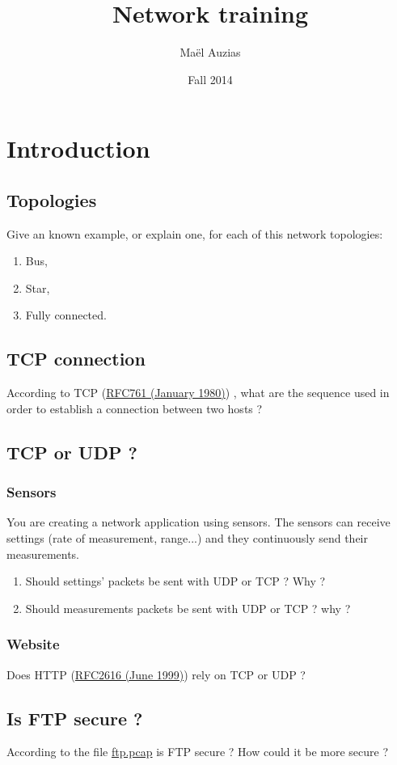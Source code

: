 \documentclass[11pt]{article}
\begin{document}
\title{Network training}
\date{Fall 2014}
\author{Maël Auzias}
\maketitle

\tableofcontents
\pagebreak


\section{Introduction}
\subsection{Topologies}
Give an known example, or explain one, for each of this network topologies:
  \begin{enumerate}
    \item Bus,
    \item Star,
    \item Fully connected.
  \end{enumerate}

\subsection{TCP connection}
According to TCP (\color{blue}\href{http://tools.ietf.org/html/rfc761}{RFC761 (January 1980)}) \color{black}, what are the sequence used in order to establish a connection between two hosts ?

\subsection{TCP or UDP ?}
\subsubsection{Sensors}
You are creating a network application using sensors. The sensors can receive settings (rate of measurement, range...) and they continuously send their measurements.
  \begin{enumerate}
    \item Should settings' packets be sent with UDP or TCP ? Why ?
    \item Should measurements packets be sent with UDP or TCP ? why ?
  \end{enumerate}

\subsubsection{Website}
Does HTTP (\color{blue}\href{http://tools.ietf.org/html/rfc2616}{RFC2616 (June 1999)}) \color{black} rely on TCP or UDP ?

\subsection{Is FTP secure ?}
According to the file \color{blue}\href{https://github.com/auzias/network-courses/db/ftp.pcap}{ftp.pcap} \color{black} is FTP secure ? How could it be more secure ?
\end{document}
